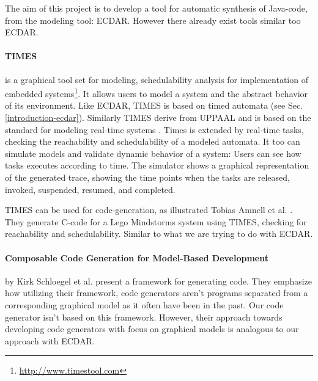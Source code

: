 The aim of this project is to develop a tool for automatic synthesis of
Java-code, from the modeling tool: ECDAR. However there already exist tools
similar too ECDAR.

\paragraph{TIMES} is a graphical tool set for modeling, schedulability analysis
for implementation of embedded
systems\footnote{\url{http://www.timestool.com}}. It allows users to model a
system and the abstract behavior of its environment. Like ECDAR, TIMES is based
on timed automata (see Sec. \ref{introduction-ecdar}). Similarly
TIMES derive from UPPAAL and is based on the standard for modeling real-time
systems \cite{Alur1994:183}.  Times is extended by real-time tasks, checking the
reachability and schedulability of a modeled automata. It too can simulate
models and validate dynamic behavior of a system: Users can see how tasks
executes according to time. The simulator shows a graphical representation of
the generated trace, showing the time points when the tasks are released,
invoked, suspended, resumed, and completed.

TIMES can be used for code-generation, as illustrated Tobias Amnell et
al. \cite{Amnell:2002:CST:779110.779112}. They generate C-code for a Lego
Mindstorms system using TIMES, checking for reachability and
schedulability. Similar to what we are trying to do with ECDAR.


\paragraph{Composable Code Generation for Model-Based Development}
by Kirk Schloegel et al. present a framework for generating
code\cite{composable-code-generation}. They emphasize how utilizing their
framework, code generators aren't programs separated from a corresponding
graphical model as it often have been in the past. Our code generator isn't
based on this framework. However, their approach towards developing code generators
with focus on graphical models is analogous to our approach with ECDAR.


